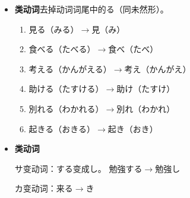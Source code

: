 \begin{itemize}
\begin{multicols}{2}
\begin{enumerate}
            \item 買う（かう）$\longrightarrow$買い（かい）
            \item 待つ（まつ）待った、待って
            \item 上がる（あがる）$\longrightarrow$上がった、上がって
            \item 切る（きる）$\longrightarrow$切った、切って
            \item 帰る（かえる）$\longrightarrow$帰った、帰って
            $\blacksquare$ 
            
            \item 倒す（たおす）$\longrightarrow$倒した、倒して
            \item 騙す（だます）$\longrightarrow$騙した、騙して
            $\blacksquare$ 
            
            \item 行く$\longrightarrow$行った、行って
            $\blacksquare$     
        \end{enumerate}

    \end{multicols}
    
    \item {\bfseries \II 类动词}去掉动词词尾中的る（同未然形）。
    
    \begin{multicols}{2}
        \begin{enumerate}
            \item 見る（みる）$\longrightarrow$見（み）
            \item 食べる（たべる）$\longrightarrow$食べ（たべ）
            \item 考える（かんがえる）$\longrightarrow$考え（かんがえ）
            \item 助ける（たすける）$\longrightarrow$助け（たすけ）
            \item 別れる（わかれる）$\longrightarrow$別れ（わかれ）
            \item 起きる（おきる）$\longrightarrow$起き（おき）
        \end{enumerate}

    \end{multicols}

    \item {\bfseries \III 类动词}
    
    サ变动词：する变成し。 勉強する$\longrightarrow$勉強し

    カ变动词：来る$\longrightarrow$き

    

\end{itemize}

